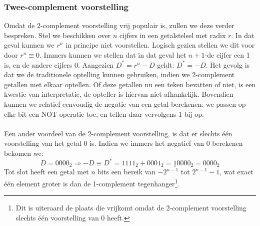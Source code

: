 \subsubsection{Twee-complement voorstelling}
Omdat de 2-complement voorstelling vrij populair is, zullen we deze verder bespreken. Stel we beschikken over $n$ cijfers in een getalstelsel met radix $r$. In dat geval kunnen we $r^n$ in principe niet voorstellen. Logisch gezien stellen we dit voor door $r^n\equiv 0$. Immers kunnen we stellen dat in dat geval het $n+1$-de cijfer een 1 is, en de andere cijfers 0. Aangezien $D^*=r^n-D$ geldt: $D^*=-D$. Het gevolg is dat we de traditionele optelling kunnen gebruiken, indien we 2-complement getallen met elkaar optellen. Of deze getallen nu een teken bevatten of niet, is een kwestie van interpretatie, de opteller is hiervan niet afhankelijk. Bovendien kunnen we relatief eenvoudig de negatie van een getal berekenen: we passen op elke bit een NOT operatie toe, en tellen daar vervolgens 1 bij op.
\paragraph{}
Een ander voordeel van de 2-complement voorstelling, is dat er slechts \'e\'en voorstelling van het getal 0 is. Indien we immers het negatief van 0 berekenen bekomen we:
\begin{equation}
D=0000_2\Rightarrow -D\equiv D^*=1111_2+0001_2=\underline{1}0000_2=0000_2
\end{equation}
Tot slot heeft een getal met $n$ bits een bereik van $-2^{n-1}$ tot $2^{n-1}-1$, wat exact \'e\'en element groter is dan de 1-complement tegenhanger\footnote{Dit is uiteraard de plaats die vrijkomt omdat de 2-complement voorstelling slechts \'e\'en voorstelling van 0 heeft.}.

